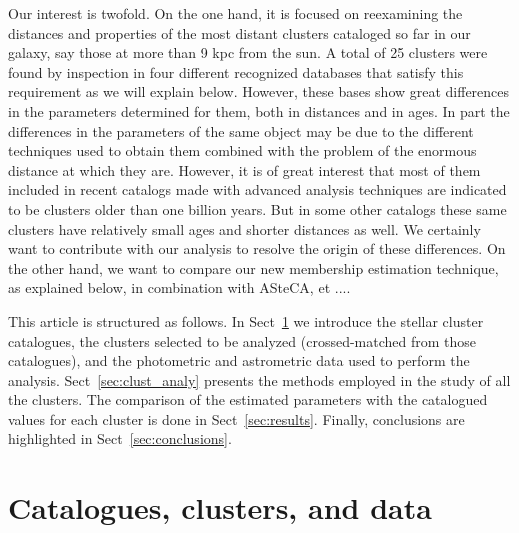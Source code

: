 \documentclass{aa}
\begin{document}
Our interest is twofold. On the one hand, it is focused on reexamining the distances
and properties of the most distant clusters cataloged so far in our galaxy, say 
those at more than 9 kpc from the sun. A total of 25 clusters were found by inspection 
in four different recognized databases that satisfy this requirement as we will 
explain below. However, these bases show great differences in the parameters 
determined for them, both in distances and in ages. In part the differences in the 
parameters of the same object may be due to the different techniques used to obtain 
them combined with the problem of the enormous distance at which they are. However, 
it is of great interest that most of them included in recent catalogs made with advanced 
analysis techniques are indicated to be clusters older than one billion years. 
But in some other catalogs these same clusters have relatively small ages and shorter 
distances as well. We certainly want to contribute with our analysis to resolve the 
origin of these differences.
On the other hand, we want to compare our new membership estimation technique, as explained below, in combination with ASteCA, et ....


 This article is structured as follows. In Sect~\ref{sec:cat_clust_data} we
 introduce the stellar cluster catalogues, the clusters selected to be
 analyzed (crossed-matched from those catalogues), and the photometric and 
 astrometric data used to perform the analysis. Sect~\ref{sec:clust_analy}
 presents the methods employed in the study of all the clusters. The comparison
 of the estimated parameters with the catalogued values for each cluster is done
 in Sect~\ref{sec:results}. Finally, conclusions are highlighted in
 Sect~\ref{sec:conclusions}.





\section{Catalogues, clusters, and data}
 \label{sec:cat_clust_data}
\end{document}
